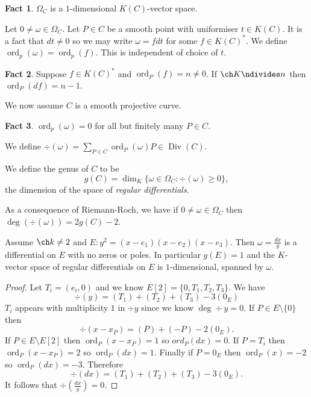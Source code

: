 \documentclass[a4paper]{article}
\theoremstyle{definition}
\newtheorem*{fact}{Fact}
\DeclareMathOperator{\ord}{ord}
\DeclareMathOperator{\Div}{Div} %
\begin{document}
\begin{fact}
  \(\Omega_C\) is a \(1\)-dimensional \(K(C)\)-vector space.
\end{fact}

Let \(0 \neq \omega \in \Omega_C\). Let \(P \in C\) be a smooth point with uniformiser \(t \in K(C)\). It is a fact that \(dt \neq 0\) so we may write \(\omega = f dt\) for some \(f \in K(C)^*\). We define \(\ord_p(\omega) = \ord_p(f)\). This is independent of choice of \(t\).

\begin{fact}
  Suppose \(f \in K(C)^*\) and \(\ord_P(f) = n \neq 0\). If \(\ch K \ndivides n\) then \(\ord_P(df) = n - 1\).
\end{fact}

We now assume \(C\) is a smooth projective curve.

\begin{fact}
  \(\ord_p(\omega) = 0\) for all but finitely many \(P \in C\).
\end{fact}

\begin{definition}
  We define \(\div(\omega) = \sum_{P \in C} \ord_P(\omega) P \in \Div(C)\).
\end{definition}

\begin{definition}
  We define the genus of \(C\) to be
  \[
    g(C) = \dim_K \{\omega \in \Omega_C: \div(\omega) \geq 0\},
  \]
  the dimension of the space of \emph{regular differentials}.
\end{definition}

As a consequence of Riemann-Roch, we have if \(0 \neq \omega \in \Omega_C\) then \(\deg(\div(\omega)) = 2 g(C) - 2\).

\begin{lemma}
  Assume \(\ch k \neq 2\) and \(E: y^2 = (x - e_1)(x - e_2)(x - e_3)\). Then \(\omega = \frac{dx}{y}\) is a differential on \(E\) with no zeros or poles. In particular \(g(E) = 1\) and the \(K\)-vector space of regular differentials on \(E\) is \(1\)-dimensional, spanned by \(\omega\).
\end{lemma}

\begin{proof}
  Let \(T_i = (e_i, 0)\) and we know \(E[2] = \{0, T_1, T_2, T_3\}\). We have
  \[
    \div (y) = (T_1) + (T_2) + (T_3) - 3(0_E)
  \]
  \(T_i\) appears with multiplicity \(1\) in \(\div y\) since we know \(\deg \div y = 0\). If \(P \in E \setminus \{0\}\) then
  \[
    \div (x - x_P) = (P) + (-P) - 2(0_E).
  \]
  If \(P \in E \setminus E[2]\) then \(\ord_P(x - x_P) = 1\) so \(ord_P(dx) = 0\). If \(P = T_i\) then \(\ord_P(x - x_P) = 2\) so \(\ord_P(dx) = 1\). Finally if \(P = 0_E\) then \(\ord_P(x) = -2\) so \(\ord_P(dx) = -3\). Therefore
  \[
    \div(dx) = (T_1) + (T_2) + (T_3) - 3(0_E).
  \]
  It follows that \(\div (\frac{dx}{y}) = 0\).
\end{proof}
\end{document}

